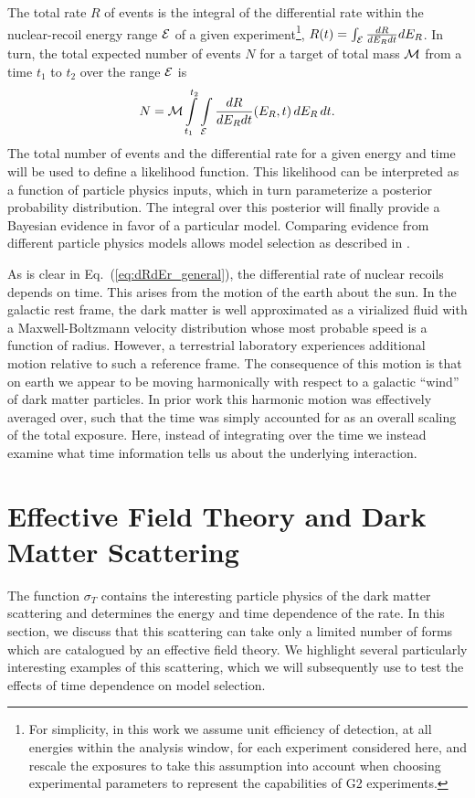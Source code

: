 \documentclass[11pt]{article}
\newcommand{\beq}{\begin{equation}} \newcommand{\eeq}{\end{equation}}
\newcommand{\Eq}[1]{Eq.~(\ref{#1})} \newcommand{\Eqs}[2]{Eqs.~(\ref{#1}) and (\ref{#2})} \newcommand{\Eqm}[2]{Eqs.~(\ref{#1}) through (\ref{#2})}
\begin{document}
The total rate $R$ of events is the integral of the differential rate within the nuclear-recoil energy range ${\cal E}$ of a given experiment\footnote{For simplicity, in this work we assume unit efficiency of detection, at all energies within the analysis window, for each experiment considered here, and rescale the exposures to take this assumption into account when choosing experimental parameters to represent the capabilities of G2 experiments.}, $R(t)=\int_{\cal E} \frac{dR}{dE_R dt} dE_R$. In turn, the total expected number of events $N$ for a target of total mass ${\cal M}$ from a time $t_1$ to $t_2$ over the range ${\cal E}$ is
\beq
N =  \cM \int\limits_{t_1}^{t_2} \int\limits_\cE  \frac{dR}{dE_R dt}(E_R,t)\,dE_R \,dt.
\eeq
The total number of events and the differential rate for a given energy and time will be used to define a likelihood function. This likelihood can be interpreted as a function of particle physics inputs, which in turn parameterize a posterior probability distribution. The integral over this posterior will finally provide a Bayesian evidence in favor of a particular model. Comparing evidence from different particle physics models allows model selection as described in \cite{Gluscevic:2014vga, Gluscevic:2015sqa}.

As is clear in \Eq{eq:dRdEr_general}, the differential rate of nuclear recoils depends on time. This arises from the motion of the earth about the sun. In the galactic rest frame, the dark matter is well approximated as a virialized fluid with a Maxwell-Boltzmann velocity distribution whose most probable speed is a function of radius. However, a terrestrial laboratory experiences additional motion relative to such a reference frame. The consequence of this motion is that on earth we appear to be moving harmonically with respect to a galactic ``wind'' of dark matter particles. In prior work this harmonic motion was effectively averaged over, such that the time was simply accounted for as an overall scaling of the total exposure. Here, instead of integrating over the time we instead examine what time information tells us about the underlying interaction.




\section{Effective Field Theory and Dark Matter Scattering}

The function $\sigma_T$ contains the interesting particle physics of the dark matter scattering and determines the energy and time dependence of the rate. In this section, we discuss that this scattering can take only a limited number of forms which are catalogued by an effective field theory. We highlight several particularly interesting examples of this scattering, which we will subsequently use to test the effects of time dependence on model selection.
\end{document}
